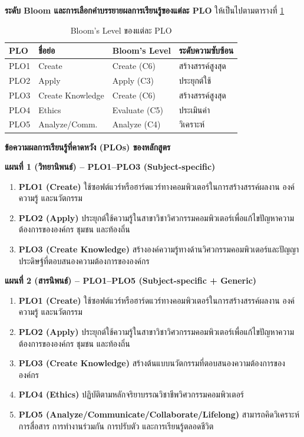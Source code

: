\noindent\textbf{ระดับ Bloom และการเลือกคำบรรยายผลการเรียนรู้ของแต่ละ PLO} ให้เป็นไปตามตารางที่ \ref{tbl:bloom_plo}

\begin{table}[H]
  \centering
  \caption{Bloom's Level ของแต่ละ PLO}
  \label{tbl:bloom_plo}
  \begin{tabularx}{\linewidth}{|>{\raggedright\arraybackslash}X|>{\raggedright\arraybackslash}X|>{\raggedright\arraybackslash}X|>{\raggedright\arraybackslash}X|}
    \hline
    \textbf{PLO} & \textbf{ชื่อย่อ} & \textbf{Bloom's Level} & \textbf{ระดับความซับซ้อน} \\
    \hline
    PLO1 & Create           & Create (C6)   & สร้างสรรค์สูงสุด \\
    PLO2 & Apply            & Apply (C3)    & ประยุกต์ใช้ \\
    PLO3 & Create Knowledge & Create (C6)   & สร้างสรรค์สูงสุด \\
    PLO4 & Ethics           & Evaluate (C5) & ประเมินค่า \\
    PLO5 & Analyze/Comm.    & Analyze (C4)  & วิเคราะห์ \\
    \hline
  \end{tabularx}
\end{table}

\noindent\textbf{ข้อความผลการเรียนรู้ที่คาดหวัง (PLOs) ของหลักสูตร}

\textbf{แผนที่ 1 (วิทยานิพนธ์) -- PLO1--PLO3 (Subject-specific)}
\begin{enumerate}
  \item \textbf{PLO1 (Create)} ใช้ซอฟต์แวร์หรือฮาร์ดแวร์ทางคอมพิวเตอร์ในการสร้างสรรค์ผลงาน องค์ความรู้ และนวัตกรรม
  \item \textbf{PLO2 (Apply)} ประยุกต์ใช้ความรู้ในสาขาวิชาวิศวกรรมคอมพิวเตอร์เพื่อแก้ไขปัญหาความต้องการขององค์กร ชุมชน และท้องถิ่น
  \item \textbf{PLO3 (Create Knowledge)} สร้างองค์ความรู้ทางด้านวิศวกรรมคอมพิวเตอร์และปัญญาประดิษฐ์ที่ตอบสนองความต้องการขององค์กร
\end{enumerate}

\textbf{แผนที่ 2 (สารนิพนธ์) -- PLO1--PLO5 (Subject-specific + Generic)}
\begin{enumerate}
  \item \textbf{PLO1 (Create)} ใช้ซอฟต์แวร์หรือฮาร์ดแวร์ทางคอมพิวเตอร์ในการสร้างสรรค์ผลงาน องค์ความรู้ และนวัตกรรม
  \item \textbf{PLO2 (Apply)} ประยุกต์ใช้ความรู้ในสาขาวิชาวิศวกรรมคอมพิวเตอร์เพื่อแก้ไขปัญหาความต้องการขององค์กร ชุมชน และท้องถิ่น
  \item \textbf{PLO3 (Create Knowledge)} สร้างต้นแบบนวัตกรรมที่ตอบสนองความต้องการขององค์กร
  \item \textbf{PLO4 (Ethics)} ปฏิบัติตามหลักจริยาบรรณวิชาชีพวิศวกรรมคอมพิวเตอร์
  \item \textbf{PLO5 (Analyze/Communicate/Collaborate/Lifelong)} สามารถคิดวิเคราะห์ การสื่อสาร การทำงานร่วมกัน การปรับตัว และการเรียนรู้ตลอดชีวิต
\end{enumerate}

